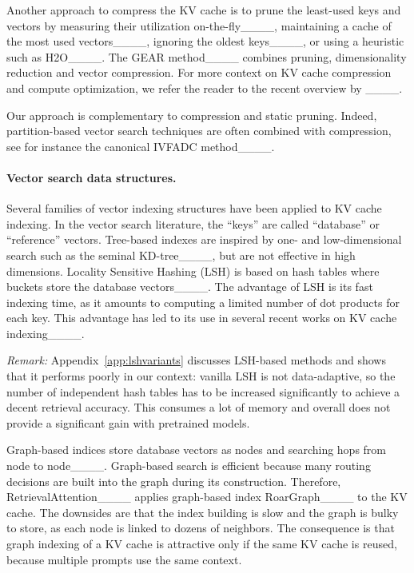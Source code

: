 Another approach to compress the KV cache is to prune the least-used keys and vectors by measuring their utilization on-the-fly____, maintaining a cache of the most used vectors____, ignoring the oldest keys____, or using a heuristic such as H2O____.
The GEAR method____ combines pruning, dimensionality reduction and vector compression.
For more context on KV cache compression and compute optimization, we refer the reader to the recent overview by ____.

Our \OURS approach is complementary to compression and static pruning. 
Indeed, partition-based vector search techniques are often combined with compression, see for instance the canonical IVFADC method____. 

%

%

%
%

%

%
%

\paragraph{Vector search data structures.}

Several families of vector indexing structures have been applied to KV cache indexing.  
In the vector search literature, the ``keys'' are called ``database'' or ``reference'' vectors. 
%
Tree-based indexes are inspired by one- and low-dimensional search such as the seminal KD-tree____, 
%
but are not effective in high dimensions. 
%
%
 Locality Sensitive Hashing (LSH) is based on hash tables where buckets store the database vectors____. 
The advantage of LSH is its fast indexing time, as it amounts to computing a limited number of dot products for each key. 
This advantage has led to its use in several recent works on KV cache indexing____. 

\textit{Remark:} Appendix~\ref{app:lshvariants} discusses LSH-based methods and shows that it performs poorly in our context: vanilla LSH is not data-adaptive, so the number of independent hash tables has to be increased significantly to achieve a decent retrieval accuracy. This consumes a lot of memory and overall does not provide a significant gain with pretrained models.  
%

Graph-based indices store database vectors as nodes and searching hops from node to node____. 
Graph-based search is efficient because many routing decisions are built into the graph during its construction. 
Therefore, RetrievalAttention____ applies graph-based index RoarGraph____ to the KV cache. 
The downsides are that the index building is slow and the graph is bulky to store, as each node is linked to dozens of neighbors. 
The consequence is that graph indexing of a KV cache is attractive only if the same KV cache is reused, \eg because multiple prompts use the same context. 

